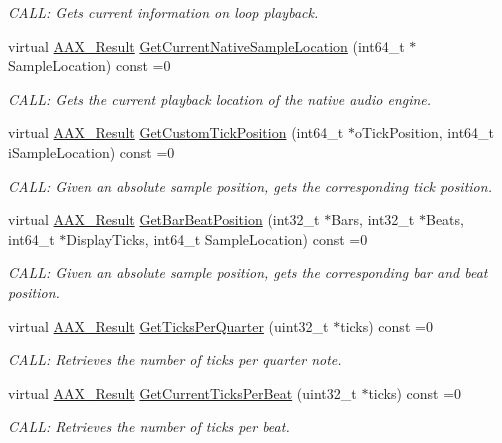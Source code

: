 \begin{DoxyCompactItemize}
\begin{DoxyCompactList}\small\item\em C\+A\+L\+L\+: Gets current information on loop playback. \end{DoxyCompactList}\item 
virtual \hyperlink{a00149_a4d8f69a697df7f70c3a8e9b8ee130d2f}{A\+A\+X\+\_\+\+Result} \hyperlink{a00082_ac76e3960bbc6c5cdabee9d70ad98491c}{Get\+Current\+Native\+Sample\+Location} (int64\+\_\+t $\ast$Sample\+Location) const =0
\begin{DoxyCompactList}\small\item\em C\+A\+L\+L\+: Gets the current playback location of the native audio engine. \end{DoxyCompactList}\item 
virtual \hyperlink{a00149_a4d8f69a697df7f70c3a8e9b8ee130d2f}{A\+A\+X\+\_\+\+Result} \hyperlink{a00082_ac4fb339830e4868adbd40910b5b72dc8}{Get\+Custom\+Tick\+Position} (int64\+\_\+t $\ast$o\+Tick\+Position, int64\+\_\+t i\+Sample\+Location) const =0
\begin{DoxyCompactList}\small\item\em C\+A\+L\+L\+: Given an absolute sample position, gets the corresponding tick position. \end{DoxyCompactList}\item 
virtual \hyperlink{a00149_a4d8f69a697df7f70c3a8e9b8ee130d2f}{A\+A\+X\+\_\+\+Result} \hyperlink{a00082_a008d750ca8181f6b300c2ed66d3b76f9}{Get\+Bar\+Beat\+Position} (int32\+\_\+t $\ast$Bars, int32\+\_\+t $\ast$Beats, int64\+\_\+t $\ast$Display\+Ticks, int64\+\_\+t Sample\+Location) const =0
\begin{DoxyCompactList}\small\item\em C\+A\+L\+L\+: Given an absolute sample position, gets the corresponding bar and beat position. \end{DoxyCompactList}\item 
virtual \hyperlink{a00149_a4d8f69a697df7f70c3a8e9b8ee130d2f}{A\+A\+X\+\_\+\+Result} \hyperlink{a00082_a0f4c97187d6aea3bab6a83645a965805}{Get\+Ticks\+Per\+Quarter} (uint32\+\_\+t $\ast$ticks) const =0
\begin{DoxyCompactList}\small\item\em C\+A\+L\+L\+: Retrieves the number of ticks per quarter note. \end{DoxyCompactList}\item 
virtual \hyperlink{a00149_a4d8f69a697df7f70c3a8e9b8ee130d2f}{A\+A\+X\+\_\+\+Result} \hyperlink{a00082_a34ea33c3457f0480e99c47bde63f6a44}{Get\+Current\+Ticks\+Per\+Beat} (uint32\+\_\+t $\ast$ticks) const =0
\begin{DoxyCompactList}\small\item\em C\+A\+L\+L\+: Retrieves the number of ticks per beat. \end{DoxyCompactList}\end{DoxyCompactItemize}


